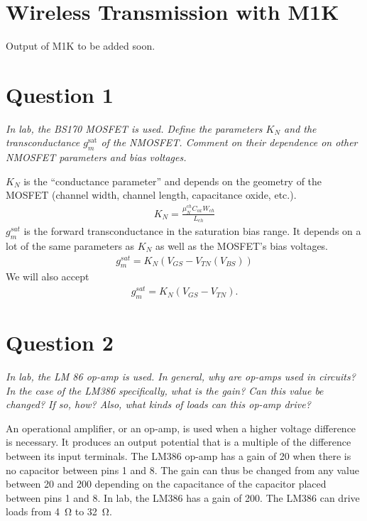 \documentclass[12pt]{../manual}
\begin{document}
\newpage
\section{Wireless Transmission with M1K}
Output of M1K to be added soon.
\begin{figure}[ht!]
\begin{center}
\end{center}
\end{figure}

\newpage
\section{Question 1}
\textit{In lab, the BS170 MOSFET is used. Define the parameters $K_N$ and the transconductance $g_m^\mathrm{sat}$ of the NMOSFET. Comment on their dependence on other NMOSFET parameters and bias voltages.}

$K_N$ is the ``conductance parameter'' and depends on the geometry of the MOSFET (channel width, channel length, capacitance oxide, etc.).
\begin{align}
K_N = \frac{\mu_N^{ch}C_{ox}W_{ch}}{L_{ch}}
\end{align}
$g_m^{sat}$ is the forward transconductance in the saturation bias range. It depends on a lot of the same parameters as $K_N$ as well as the MOSFET's bias voltages.
\begin{align}
g_m^{sat} = K_N \left( V_{GS} - V_{TN}(V_{BS}) \right)
\end{align}
We will also accept
\begin{align}
g_m^{sat} = K_N \left( V_{GS} - V_{TN} \right).
\end{align}
\section{Question 2}
\textit{In lab, the LM 86 op-amp is used. In general, why are op-amps used in circuits? In the case of the LM386 specifically, what is the gain? Can this value be changed? If so, how? Also, what kinds of loads can this op-amp drive?}

An operational amplifier, or an op-amp, is used when a higher voltage difference is necessary. It produces an output potential that is a multiple of the difference between its input terminals. The LM386 op-amp has a gain of 20 when there is no capacitor between pins 1 and 8. The gain can thus be changed from any value between 20 and 200 depending on the capacitance of the capacitor placed between pins 1 and 8. In lab, the LM386 has a gain of 200. The LM386 can drive loads from \SI{4}{\ohm} to \SI{32}{\ohm}.
\end{document}
